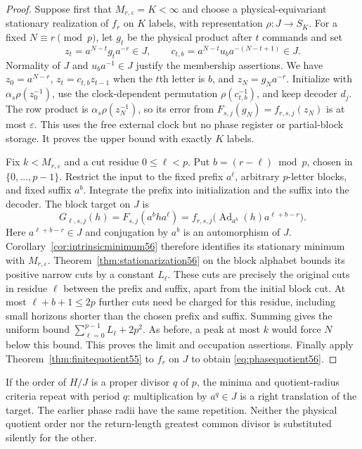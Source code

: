 \begin{proof}
Suppose first that $M_{r,\varepsilon}=K<\infty$ and choose a physical-equivariant stationary realization of $f_r$ on $K$ labels, with representation $\rho:J\to S_K$. For a fixed $N\equiv r\pmod p$, let $g_t$ be the physical product after $t$ commands and set
\begin{equation}\label{eq:gauge56}
 z_t=a^{N-t}g_ta^{-r}\in J,
 \qquad c_{t,b}=a^{N-t}u_ba^{-(N-t+1)}\in J.
\end{equation}
Normality of $J$ and $u_ba^{-1}\in J$ justify the membership assertions. We have $z_0=a^{N-r}$, $z_t=c_{t,b}z_{t-1}$ when the $t$th letter is $b$, and $z_N=g_Na^{-r}$. Initialize with $\alpha_s\rho(z_0^{-1})$, use the clock-dependent permutation $\rho(c_{t,b}^{-1})$, and keep decoder $d_j$. The row product is $\alpha_s\rho(z_N^{-1})$, so its error from $F_{s,j}(g_N)=f_{r,s,j}(z_N)$ is at most $\varepsilon$. This uses the free external clock but no phase register or partial-block storage. It proves the upper bound with exactly $K$ labels.

Fix $k<M_{r,\varepsilon}$ and a cut residue $0\le\ell<p$. Put $b=(r-\ell)\bmod p$, chosen in $\{0,\ldots,p-1\}$. Restrict the input to the fixed prefix $a^\ell$, arbitrary $p$-letter blocks, and fixed suffix $a^b$. Integrate the prefix into initialization and the suffix into the decoder. The block target on $J$ is
\[
 G_{\ell,s,j}(h)=F_{s,j}(a^b h a^\ell)
     =f_{r,s,j}\bigl(\operatorname{Ad}_{a^b}(h)a^{\ell+b-r}\bigr).
\]
Here $a^{\ell+b-r}\in J$ and conjugation by $a^b$ is an automorphism of $J$. Corollary~\ref{cor:intrinsicminimum56} therefore identifies its stationary minimum with $M_{r,\varepsilon}$. Theorem~\ref{thm:stationarization56} on the block alphabet bounds its positive narrow cuts by a constant $L_\ell$. These cuts are precisely the original cuts in residue $\ell$ between the prefix and suffix, apart from the initial block cut. At most  $\ell+b+1\le2p$ further cuts need be charged for this residue, including small horizons shorter than the chosen prefix and suffix. Summing gives the uniform bound $\sum_{\ell=0}^{p-1}L_\ell+2p^2$. As before, a peak at most $k$ would force $N$ below this bound. This proves the limit and occupation assertions. Finally apply Theorem~\ref{thm:finitequotient55} to $f_r$ on $J$ to obtain \eqref{eq:phasequotient56}.
\end{proof}
If the order of $H/J$ is a proper divisor $q$ of $p$, the minima and quotient-radius criteria repeat with period $q$: multiplication by $a^q\in J$ is a right translation of the target. The earlier phase radii have the same repetition. Neither the physical quotient order nor the return-length greatest common divisor is substituted silently for the other.

